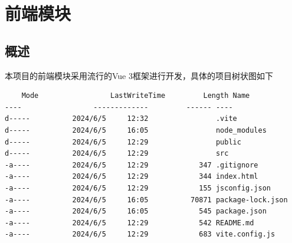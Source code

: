 \documentclass{report}
\begin{document}
\section{前端模块}
\subsection{概述}
本项目的前端模块采用流行的Vue 3框架进行开发，具体的项目树状图如下
\begin{verbatim}
    Mode                 LastWriteTime         Length Name
----                 -------------         ------ ----
d-----          2024/6/5     12:32                .vite
d-----          2024/6/5     16:05                node_modules
d-----          2024/6/5     12:29                public
d-----          2024/6/5     12:29                src
-a----          2024/6/5     12:29            347 .gitignore
-a----          2024/6/5     12:29            344 index.html
-a----          2024/6/5     12:29            155 jsconfig.json
-a----          2024/6/5     16:05          70871 package-lock.json
-a----          2024/6/5     16:05            545 package.json
-a----          2024/6/5     12:29            542 README.md
-a----          2024/6/5     12:29            683 vite.config.js
\end{verbatim}
\end{document}
